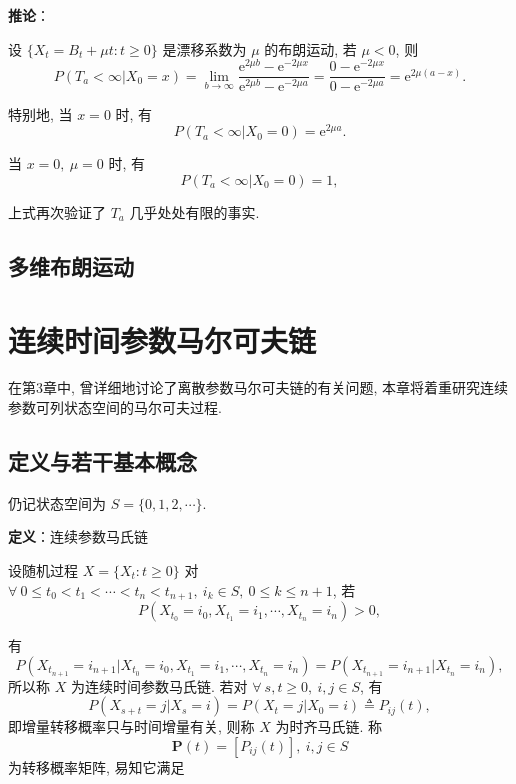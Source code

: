 \documentclass[openany]{ctexbook}
\theoremstyle{kaiti}
\theoremstyle{normal}
\begin{document}
\textbf{推论}：

设 $\{X_t=B_t+\mu t:t\geqslant0\}$ 是漂移系数为 $\mu$ 的布朗运动, 若 $\mu<0$, 则
\begin{equation}
  P(T_a<\infty|X_0=x)=\lim_{b\to\infty}\frac{\mathrm{e}^{2\mu b}-\mathrm{e}^{-2\mu x}}{\mathrm{e}^{2\mu b}-\mathrm{e}^{-2\mu a}}=\frac{0-\mathrm{e}^{-2\mu x}}{0-\mathrm{e}^{-2\mu a}}=\mathrm{e}^{2\mu (a-x)}.
\end{equation}

特别地, 当 $x=0$ 时, 有
\begin{equation}
  P(T_a<\infty|X_0=0)=\mathrm{e}^{2\mu a}.
\end{equation}

当 $x=0,~\mu=0$ 时, 有
\begin{equation}
  P(T_a<\infty|X_0=0)=1,
\end{equation}

上式再次验证了 $T_a$ 几乎处处有限的事实.

\section{多维布朗运动}

\chapter{连续时间参数马尔可夫链}

在第3章中, 曾详细地讨论了离散参数马尔可夫链的有关问题, 本章将着重研究连续参数可列状态空间的马尔可夫过程.

\section{定义与若干基本概念}

仍记状态空间为 $S=\{0,1,2,\cdots\}$.

\textbf{定义}：连续参数马氏链

设随机过程 $X=\{X_t:t\geqslant0\}$ 对 $\forall~0\leqslant t_0 < t_1 < \cdots < t_n < t_{n+1},~i_k\in S,~0\leqslant k\leqslant n+1$, 若
\begin{equation}
  P(X_{t_0}=i_0,X_{t_1}=i_1,\cdots,X_{t_n}=i_n)>0,
\end{equation}

有
\begin{equation}
  P(X_{t_{n+1}}=i_{n+1}|X_{t_0}=i_0,X_{t_1}=i_1,\cdots,X_{t_n}=i_n)=P(X_{t_{n+1}}=i_{n+1}|X_{t_n}=i_n),
\end{equation}
所以称 $X$ 为连续时间参数马氏链. 若对 $\forall~s,t\geqslant0,~i,j\in S$, 有
\begin{equation}
  P(X_{s+t}=j|X_s=i)=P(X_t=j|X_0=i)\triangleq P_{ij}(t),
\end{equation}
即增量转移概率只与时间增量有关, 则称 $X$ 为时齐马氏链. 称
\begin{equation}
  \bm{P}(t)=[P_{ij}(t)],~i,j\in S
\end{equation}
 为转移概率矩阵, 易知它满足
\end{document}
